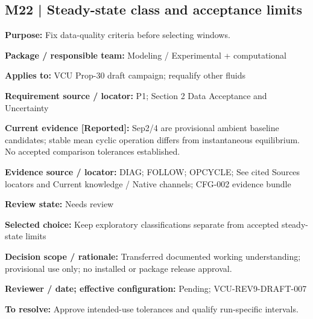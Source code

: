 \documentclass[11pt]{article}
\begin{document}
\par\noindent\begin{minipage}{\textwidth}\small\setlength{\parskip}{2pt}
\subsection*{M22 | Steady-state class and acceptance limits}
\textbf{Purpose:} Fix data-quality criteria before selecting windows.\par
\textbf{Package / responsible team:} Modeling / Experimental + computational\par
\textbf{Applies to:} VCU Prop-30 draft campaign; requalify other fluids\par
\textbf{Requirement source / locator:} P1; Section 2 Data Acceptance and Uncertainty\par
\textbf{Current evidence [Reported]:} Sep2/4 are provisional ambient baseline candidates; stable mean cyclic operation differs from instantaneous equilibrium. No accepted comparison tolerances established.\par
\textbf{Evidence source / locator:} DIAG; FOLLOW; OPCYCLE; See cited Sources locators and Current knowledge / Native channels; CFG-002 evidence bundle\par
\textbf{Review state:} Needs review\par
\textbf{Selected choice:} Keep exploratory classifications separate from accepted steady-state limits\par
\textbf{Decision scope / rationale:} Transferred documented working understanding; provisional use only; no installed or package release approval.\par
\textbf{Reviewer / date; effective configuration:} Pending; VCU-REV9-DRAFT-007\par
\textbf{To resolve:} Approve intended-use tolerances and qualify run-specific intervals.\par
\end{minipage}\par\vspace{5pt}
\end{document}
